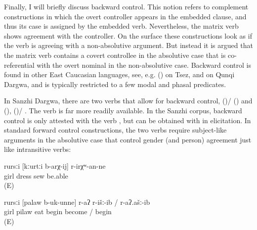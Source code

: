 Finally, I will briefly discuss backward control. This notion refers to complement constructions in which the overt controller appears in the embedded clause, and thus its case is assigned by the embedded verb. Nevertheless, the matrix verb shows agreement with the controller. On the surface these constructions look as if the verb is agreeing with a non-absolutive argument. But instead it is argued that the matrix verb contains a covert controllee in the absolutive case that is co-referential with the overt nominal in the non-absolutive case. Backward control is found in other East Caucasian languages, see, e.g.  () on Tsez, and \citet{Serdobolskaya2010} on Qunqi Dargwa, and is typically restricted to a few modal and phasal predicates.

In Sanzhi Dargwa, there are two verbs that allow for backward control,  ()\slash{} ()  and  (),  ()\slash{} . The verb  is far more readily available. In the Sanzhi corpus, backward control is only attested with the verb , but can be obtained with  in elicitation. In standard forward control constructions, the two verbs require subject-like arguments in the absolutive case that control gender (and person) agreement just like intransitive verbs:
%
\begin{exe}
	\ex
	\gll	rursːi	[kːurtːi	b-arχ-ij]	r-irχʷ-an-ne\\
		girl	dress	sew	be.able\\
	\glt	{} (E)

	\ex
	\gll	rursːi	[palaw	b-uk-unne]	r-aʔ	r-išː-ib	/	r-aʔ.ašː-ib\\
		girl	pilaw	eat \tsc{f-}begin	become	/ begin\\
	\glt	{} (E)
\end{exe}

